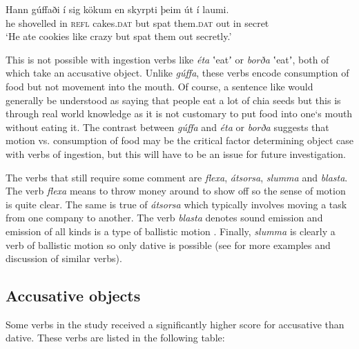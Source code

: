 \documentclass[output=paper,modfonts,nonflat,colorlinks,citecolor=brown]{langsci/langscibook}
\begin{document}
\ea%
    \label{ex:jonsson:4}
\gll     Hann   gúffaði   í   sig   kökum   en   skyrpti   þeim   út   í    laumi.\\
  he   shovelled   in   \textsc{refl}   cakes.\textsc{dat}   but   spat   them\textsc{.dat}   out   in   secret\\
\glt `He ate cookies like crazy but spat them out secretly.'
\z

This is not possible with ingestion verbs like \textit{éta} ʽeatʼ or \textit{borða} ʽeatʼ, both of which take an accusative object. Unlike \textit{gúffa}, these verbs encode consumption of food but not movement into the mouth. Of course, a sentence like  would generally be understood as saying that people eat a lot of chia seeds but this is through real world knowledge as it is not customary to put food into one‘s mouth without eating it. The contrast between \textit{gúffa} and \textit{éta} or \textit{borða} suggests that motion vs. consumption of food may be the critical factor determining object case with verbs of ingestion, but this will have to be an issue for future investigation.

The verbs that still require some comment are \textit{flexa}, \textit{átsorsa}, \textit{slumma} and \textit{blasta}. The verb \textit{flexa} means to throw money around to show off so the sense of motion is quite clear. The same is true of \textit{átsorsa} which typically involves moving a task from one company to another. The verb \textit{blasta} denotes sound emission and emission of all kinds is a type of ballistic motion \citep{Jónsson2013a}. Finally, \textit{slumma} is clearly a verb of ballistic motion so only dative is possible (see \citealt{Jónsson2013a} for more examples and discussion of similar verbs).

\subsection{Accusative objects} %
\label{sec:jonsson:3.3}

Some verbs in the study received a significantly higher score for accusative than dative. These verbs are listed in the following table:
\end{document}
